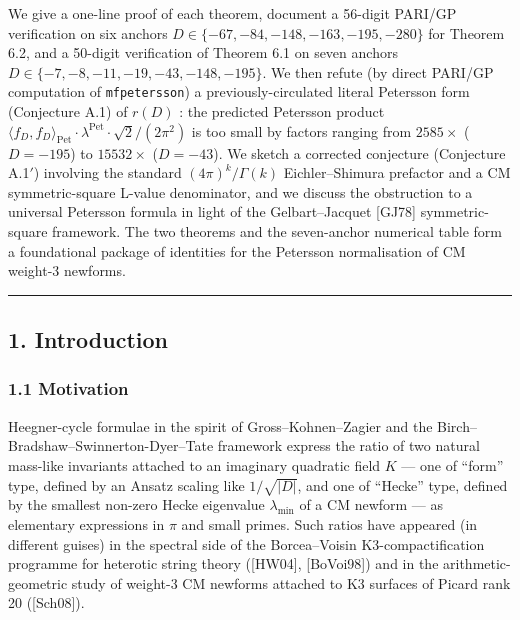 \documentclass[
  11pt,
  a4paper,
]{amsart}
\begin{document}
We give a one-line proof of each theorem, document a 56-digit PARI/GP verification on six anchors \(D\in\{-67,-84,-148,-163,-195,-280\}\) for Theorem 6.2, and a 50-digit verification of Theorem 6.1 on seven anchors \(D\in\{-7,-8,-11,-19,-43,-148,-195\}\). We then refute (by direct PARI/GP computation of \texttt{mfpetersson}) a previously-circulated literal Petersson form (Conjecture A.1) of \(r(D)\) : the predicted Petersson product \(\langle f_D, f_D\rangle_{\mathrm{Pet}} \cdot \lambda^{\mathrm{Pet}} \cdot \sqrt 2/(2\pi^2)\) is too small by factors ranging from \(2585\times\) (\(D = -195\)) to \(15532\times\) (\(D = -43\)). We sketch a corrected conjecture (Conjecture A.1\('\)) involving the standard \((4\pi)^{k}/\Gamma(k)\) Eichler--Shimura prefactor and a CM symmetric-square L-value denominator, and we discuss the obstruction to a universal Petersson formula in light of the Gelbart--Jacquet {[}GJ78{]} symmetric-square framework. The two theorems and the seven-anchor numerical table form a foundational package of identities for the Petersson normalisation of CM weight-3 newforms.

\begin{center}\rule{0.5\linewidth}{0.5pt}\end{center}

\hypertarget{introduction}{%
\subsection{1. Introduction}\label{introduction}}

\hypertarget{motivation}{%
\subsubsection{1.1 Motivation}\label{motivation}}

Heegner-cycle formulae in the spirit of Gross--Kohnen--Zagier and the Birch--Bradshaw--Swinnerton-Dyer--Tate framework express the ratio of two natural mass-like invariants attached to an imaginary quadratic field \(K\) --- one of ``form'' type, defined by an Ansatz scaling like \(1/\sqrt{|D|}\), and one of ``Hecke'' type, defined by the smallest non-zero Hecke eigenvalue \(\lambda_{\min}\) of a CM newform --- as elementary expressions in \(\pi\) and small primes. Such ratios have appeared (in different guises) in the spectral side of the Borcea--Voisin K3-compactification programme for heterotic string theory ({[}HW04{]}, {[}BoVoi98{]}) and in the arithmetic-geometric study of weight-3 CM newforms attached to K3 surfaces of Picard rank 20 ({[}Sch08{]}).
\end{document}
